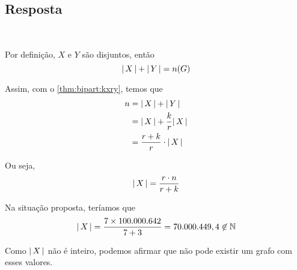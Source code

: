\subsection{Resposta} ~

Por definição, $X$ e $Y$ são disjuntos, então
\[
    {\left\lvert\,X\,\right\rvert} + {\left\lvert\,Y\,\right\rvert} = n(G)
\]

Assim, com o \cref{thm:bipart:kxry}, temos que
\begin{align*}
    n &= {\left\lvert\,X\,\right\rvert} + {\left\lvert\,Y\,\right\rvert} \\
        &= {\left\lvert\,X\,\right\rvert} + \frac{k}{r} {\left\lvert\,X\,\right\rvert} \\
        &= \frac{r + k}{r} \cdot {\left\lvert\,X\,\right\rvert}
\end{align*}

Ou seja,
\[
    {\left\lvert\,X\,\right\rvert} = \frac{r \cdot n}{r + k}
\]

Na situação proposta, teríamos que
\[
    {\left\lvert\,X\,\right\rvert} = \frac{7 \times 100.000.642}{7 + 3} = 70.000.449,4 \not\in \operatorname{\mathbb{N}}
\]

Como ${\left\lvert\,X\,\right\rvert}$ não é inteiro, podemos afirmar que não pode existir um grafo com esses valores.
